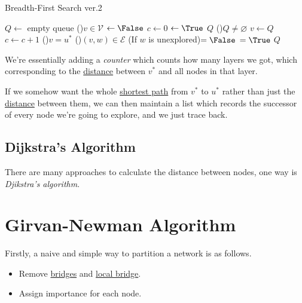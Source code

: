 \begin{algorithm}[H]\label{algo:BFS-2}
	\DontPrintSemicolon
	\caption{Breadth-First Search ver.2}
	\BlankLine
	\(Q\gets \) empty queue
	\For(){\(v\in \mathcal{V} \)}{
		\(\gets \False\)
	}
	\(c\gets 0\) 
	\;
	\(\gets \True\) 
	\(Q\)\;
	\;
	\While(){\(Q\neq \varnothing \)}{
		\(v\gets Q\)\pop{}\;
		\(c\gets c + 1\)\;
		\If(){\(v = u^{\ast} \)}{
		}
		\For(){\((v, w)\in\mathcal{E}\)}{
			\If(If \(w\) is unexplored){\(= \False\)}{
				\(=\True\)
				\(Q\)\;
			}
		}
	}
	\Return{}\;
\end{algorithm}

\begin{intuition}[Counter]
	We're essentially adding a \emph{counter} which counts how many layers we got, which corresponding to the \hyperref[def:distance-between-nodes]{distance} between
	\(v^{\ast} \) and all nodes in that layer.
\end{intuition}

\begin{remark}
	If we somehow want the whole \hyperref[def:shortest-path]{shortest path} from \(v^{\ast} \) to \(u^{\ast} \) rather than just the \hyperref[def:distance-between-nodes]{distance} between them, we can then maintain a list which records the successor of every node we're going to explore, and we just trace back.
\end{remark}

\subsection{Dijkstra's Algorithm}
There are many approaches to calculate the distance between nodes, one way is \emph{Djikstra's algorithm}.

\section{Girvan-Newman Algorithm}
Firstly, a naive and simple way to partition a network is as follows.
\begin{itemize}
	\item Remove \hyperref[def:bridge]{bridges} and \hyperref[def:local-bridge]{local bridge}.
	\item Assign importance for each node.
\end{itemize}


